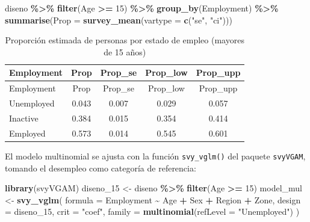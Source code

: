\documentclass[
  spanish,
  12pt,
]{book}
\newenvironment{Shaded}{\begin{snugshade}}{\end{snugshade}}
\newcommand{\AttributeTok}[1]{\textcolor[rgb]{0.13,0.29,0.53}{#1}}
\newcommand{\DecValTok}[1]{\textcolor[rgb]{0.00,0.00,0.81}{#1}}
\newcommand{\FunctionTok}[1]{\textcolor[rgb]{0.13,0.29,0.53}{\textbf{#1}}}
\newcommand{\NormalTok}[1]{#1}
\newcommand{\OtherTok}[1]{\textcolor[rgb]{0.56,0.35,0.01}{#1}}
\newcommand{\SpecialCharTok}[1]{\textcolor[rgb]{0.81,0.36,0.00}{\textbf{#1}}}
\newcommand{\StringTok}[1]{\textcolor[rgb]{0.31,0.60,0.02}{#1}}
\begin{document}
\begin{Shaded}
\begin{Highlighting}[]
\NormalTok{diseno }\SpecialCharTok{\%\textgreater{}\%}
  \FunctionTok{filter}\NormalTok{(Age }\SpecialCharTok{\textgreater{}=} \DecValTok{15}\NormalTok{) }\SpecialCharTok{\%\textgreater{}\%}
  \FunctionTok{group\_by}\NormalTok{(Employment) }\SpecialCharTok{\%\textgreater{}\%}
  \FunctionTok{summarise}\NormalTok{(}\AttributeTok{Prop =} \FunctionTok{survey\_mean}\NormalTok{(}\AttributeTok{vartype =} \FunctionTok{c}\NormalTok{(}\StringTok{"se"}\NormalTok{, }\StringTok{"ci"}\NormalTok{)))}
\end{Highlighting}
\end{Shaded}

\begin{longtable}[]{@{}lcccc@{}}
\caption{\label{tab:tab-prop-empleo-15}Proporción estimada de personas por estado de empleo (mayores de 15 años)}\tabularnewline
\toprule\noalign{}
Employment & Prop & Prop\_se & Prop\_low & Prop\_upp \\
\midrule\noalign{}
\endfirsthead
\toprule\noalign{}
Employment & Prop & Prop\_se & Prop\_low & Prop\_upp \\
\midrule\noalign{}
\endhead
\bottomrule\noalign{}
\endlastfoot
Unemployed & 0.043 & 0.007 & 0.029 & 0.057 \\
Inactive & 0.384 & 0.015 & 0.354 & 0.414 \\
Employed & 0.573 & 0.014 & 0.545 & 0.601 \\
\end{longtable}

El modelo multinomial se ajusta con la función \texttt{svy\_vglm()} del paquete \texttt{svyVGAM}, tomando el desempleo como categoría de referencia:

\begin{Shaded}
\begin{Highlighting}[]
\FunctionTok{library}\NormalTok{(svyVGAM)}
\NormalTok{diseno\_15  }\OtherTok{\textless{}{-}}\NormalTok{ diseno }\SpecialCharTok{\%\textgreater{}\%} \FunctionTok{filter}\NormalTok{(Age }\SpecialCharTok{\textgreater{}=} \DecValTok{15}\NormalTok{)}
\NormalTok{model\_mul  }\OtherTok{\textless{}{-}} \FunctionTok{svy\_vglm}\NormalTok{(}
  \AttributeTok{formula  =}\NormalTok{ Employment }\SpecialCharTok{\textasciitilde{}}\NormalTok{ Age }\SpecialCharTok{+}\NormalTok{ Sex }\SpecialCharTok{+}\NormalTok{ Region }\SpecialCharTok{+}\NormalTok{ Zone,}
  \AttributeTok{design   =}\NormalTok{ diseno\_15,}
  \AttributeTok{crit     =} \StringTok{"coef"}\NormalTok{,}
  \AttributeTok{family   =} \FunctionTok{multinomial}\NormalTok{(}\AttributeTok{refLevel =} \StringTok{"Unemployed"}\NormalTok{)}
\NormalTok{)}
\end{Highlighting}
\end{Shaded}
\end{document}
